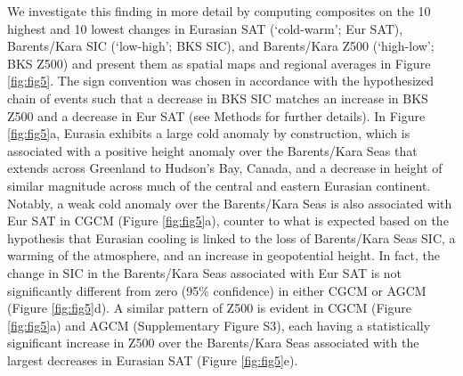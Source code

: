 \documentclass{nature}
\begin{document}
We investigate this finding in more detail by computing composites on the 10 highest and 10 lowest changes in Eurasian SAT (`cold-warm'; Eur SAT), Barents/Kara SIC (`low-high'; BKS SIC), and Barents/Kara Z500 (`high-low'; BKS Z500) and present them as spatial maps and regional averages in Figure \ref{fig:fig5}. The sign convention was chosen in accordance with the hypothesized chain of events such that a decrease in BKS SIC matches an increase in BKS Z500 and a decrease in Eur SAT (see Methods for further details). In Figure \ref{fig:fig5}a, Eurasia exhibits a large cold anomaly by construction, which is associated with a positive height anomaly over the Barents/Kara Seas that extends across Greenland to Hudson's Bay, Canada, and a decrease in height of similar magnitude across much of the central and eastern Eurasian continent. Notably, a weak cold anomaly over the Barents/Kara Seas is also associated with Eur SAT in CGCM (Figure \ref{fig:fig5}a), counter to what is expected based on the hypothesis that Eurasian cooling is linked to the loss of Barents/Kara Seas SIC, a warming of the atmosphere, and an increase in geopotential height. In fact, the change in SIC in the Barents/Kara Seas associated with Eur SAT is not significantly different from zero (95\% confidence) in either CGCM or AGCM (Figure \ref{fig:fig5}d). A similar pattern of Z500 is evident in CGCM (Figure \ref{fig:fig5}a) and AGCM (Supplementary Figure S3), each having a statistically significant increase in Z500 over the Barents/Kara Seas associated with the largest decreases in Eurasian SAT (Figure \ref{fig:fig5}e). %
\end{document}
